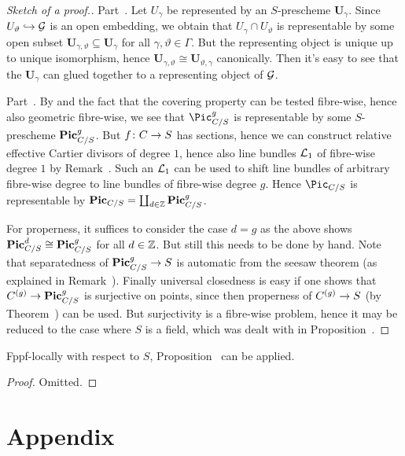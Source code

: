 \documentclass[a4paper,parskip=half,numbers=enddot, DIV=12]{scrreprt}
\begin{document}
\begin{proof}[Sketch of a proof.]
	Part~. Let $U_\gamma$ be represented by an $S$-prescheme $\boldsymbol{U}_\gamma$. Since $U_\vartheta\monomorphism \Gg$ is an open embedding, we obtain that $U_\gamma\cap U_\vartheta$ is representable by some open subset $\boldsymbol{U}_{\gamma,\vartheta}\subseteq \boldsymbol{U}_{\gamma}$ for all $\gamma,\vartheta\in\Gamma$. But the representing object is unique up to unique isomorphism, hence $\boldsymbol{U}_{\gamma,\vartheta}\cong \boldsymbol{U}_{\vartheta,\gamma}$ canonically. Then it's easy to see that the $\boldsymbol{U}_\gamma$ can glued together to a representing object of $\mathcal{G}$.
	
	Part~. By  and the fact that the covering property can be tested fibre-wise, hence also geometric fibre-wise, we see that $\Pic_{C/S}^g$ is representable by some $S$-prescheme $\mathbf{Pic}_{C/S}^g$. But $f\colon C\morphism S$ has sections, hence we can construct relative effective Cartier divisors of degree $1$, hence also line bundles $\mathcal{L}_1$ of fibre-wise degree $1$ by Remark~. Such an $\mathcal{L}_1$ can be used to shift line bundles of arbitrary fibre-wise degree to line bundles of fibre-wise degree $g$. Hence $\Pic_{C/S}$ is representable by $\mathbf{Pic}_{C/S}=\coprod_{d\in\mathbb{Z}}\mathbf{Pic}_{C/S}^g$.
	
	For properness, it suffices to consider the case $d=g$ as the above shows $\mathbf{Pic}_{C/S}^d\cong \mathbf{Pic}_{C/S}^g$ for all $d\in\mathbb{Z}$. But still this needs to be done by hand. Note that separatedness of $\PIC_{C/S}^g\morphism S$ is automatic from the seesaw theorem (as explained in Remark~). Finally universal closedness is easy if one shows that $C^{(g)}\morphism\PIC_{C/S}^g$ is surjective on points, since then properness of $C^{(g)}\morphism S$ (by Theorem~) can be used. But surjectivity is a fibre-wise problem, hence it may be reduced to the case where $S$ is a field, which was dealt with in Proposition~.
\end{proof}
\begin{prop}
	Fppf-locally with respect to $S$, Proposition~ can be applied.
\end{prop}
\begin{proof}
	Omitted.
\end{proof}


\Appendix
\chapter{Appendix}
\end{document}
